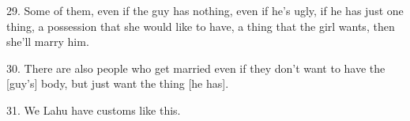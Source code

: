 29. Some of them, even if the guy has nothing, even if he's ugly, if he has just one thing, a possession that she would like to have, a thing that the girl wants, then she'll marry him.

30. There are also people who get married even if they don't want to have the [guy’s] body, but just want the thing [he has].

31. We Lahu have customs like this.
